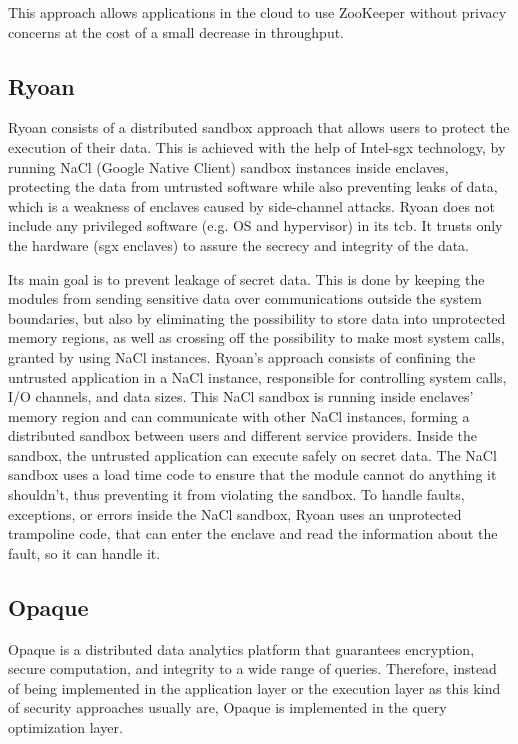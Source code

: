 This approach allows applications in the cloud to use ZooKeeper without privacy concerns at the cost of a small decrease in throughput.

\subsection{Ryoan}
\label{ssec:ryoan_sandboxing}

Ryoan \cite{ryoanPaper} consists of a distributed sandbox approach that allows users to protect the execution of their data. This is achieved with the help of Intel-\gls{sgx} \cite{intelSGX} \cite{sgxPaper} technology, by running NaCl (Google Native Client) sandbox instances inside enclaves, protecting the data from untrusted software while also preventing leaks of data, which is a weakness of enclaves caused by side-channel attacks.
Ryoan does not include any privileged software (e.g. OS and hypervisor) in its \gls{tcb}. It trusts only the hardware (\gls{sgx} enclaves) to assure the secrecy and integrity of the data.

Its main goal is to prevent leakage of secret data. This is done by keeping the modules from sending sensitive data over communications outside the system boundaries, but also by eliminating the possibility to store data into unprotected memory regions, as well as crossing off the possibility to make most system calls, granted by using NaCl instances. 
Ryoan's approach consists of confining the untrusted application in a NaCl instance, responsible for controlling system calls, I/O channels, and data sizes. This NaCl sandbox is running inside enclaves' memory region and can communicate with other NaCl instances, forming a distributed sandbox between users and different service providers. Inside the sandbox, the untrusted application can execute safely on secret data. The NaCl sandbox uses a load time code to ensure that the module cannot do anything it shouldn't, thus preventing it from violating the sandbox. To handle faults, exceptions, or errors inside the NaCl sandbox, Ryoan uses an unprotected trampoline code, that can enter the enclave and read the information about the fault, so it can handle it.
\subsection{Opaque}
\label{ssec:opaque}

Opaque \cite{opaquePaper} is a distributed data analytics platform that guarantees encryption, secure computation, and integrity to a wide range of queries. Therefore, instead of being implemented in the application layer or the execution layer as this kind of security approaches usually are, Opaque is implemented in the query optimization layer. 


